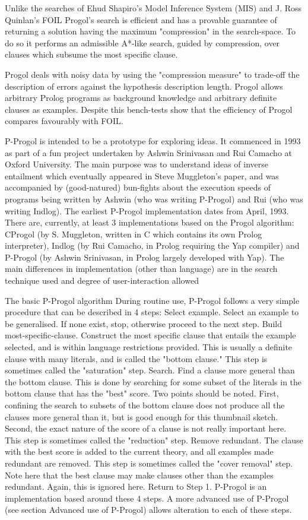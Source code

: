 Unlike the searches of Ehud Shapiro's Model Inference System (MIS) and J. Ross Quinlan's FOIL Progol's search is efficient and has a provable guarantee of returning a solution having the maximum "compression" in the search-space. To do so it performs an admissible A*-like search, guided by compression, over clauses which subsume the most specific clause.

Progol deals with noisy data by using the "compression measure" to trade-off the description of errors against the hypothesis description length. Progol allows arbitrary Prolog programs as background knowledge and arbitrary definite clauses as examples. Despite this bench-tests show that the efficiency of Progol compares favourably with FOIL.
\nocite{wiki:progol}

P-Progol is intended to be a prototype for exploring ideas. It commenced in 1993 as part of a fun project undertaken by Ashwin Srinivasan and Rui Camacho at Oxford University. The main purpose was to understand ideas of inverse entailment which eventually appeared in Steve Muggleton's paper, and was accompanied by (good-natured) bun-fights about the execution speeds of programs being written by Ashwin (who was writing P-Progol) and Rui (who was writing Indlog). The earliest P-Progol implementation dates from April, 1993. There are, currently, at least 3 implementations based on the Progol algorithm: CProgol (by S. Muggleton, written in C which contains its own Prolog interpreter), Indlog (by Rui Camacho, in Prolog requiring the Yap compiler) and P-Progol (by Ashwin Srinivasan, in Prolog largely developed with Yap). The main differences in implementation (other than language) are in the search technique used and degree of user-interaction allowed

The basic P-Progol algorithm
During routine use, P-Progol follows a very simple procedure that can be described in 4 steps:
Select example. Select an example to be generalised. If none exist, stop, otherwise proceed to the next step.
Build most-specific-clause. Construct the most specific clause that entails the example selected, and is within language restrictions provided. This is usually a definite clause with many literals, and is called the "bottom clause." This step is sometimes called the "saturation" step.
Search. Find a clause more general than the bottom clause. This is done by searching for some subset of the literals in the bottom clause that has the "best" score. Two points should be noted. First, confining the search to subsets of the bottom clause does not produce all the clauses more general than it, but is good enough for this thumbnail sketch. Second, the exact nature of the score of a clause is not really important here. This step is sometimes called the "reduction" step.
Remove redundant. The clause with the best score is added to the current theory, and all examples made redundant are removed. This step is sometimes called the "cover removal" step. Note here that the best clause may make clauses other than the examples redundant. Again, this is ignored here. Return to Step 1.
P-Progol is an implementation based around these 4 steps. A more advanced use of P-Progol (see section Advanced use of P-Progol) allows alteration to each of these steps.


